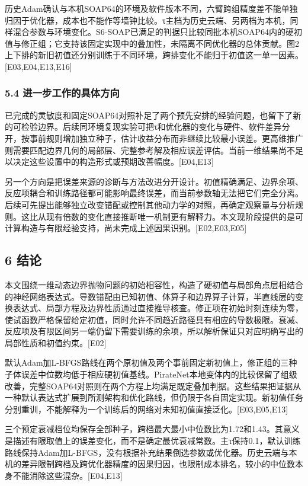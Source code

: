\documentclass[11pt,a4paper]{article}
\begin{document}
历史Adam确认与本机SOAP64的环境及软件版本不同，六臂跨组精度差不能单独归因于优化器，成本也不能作等墙钟比较。τ主档为历史云端、另两档为本机，同样混合参数与环境变化。S6-SOAP已满足的判据只比较同批本机SOAP64内的硬初值与修正组；它支持该固定实现中的叠加性，未隔离不同优化器的总体贡献。图2上下排的新旧初值还分别训练于不同环境，跨排变化不能归于初值这一单一因素。{[}E03,E04,E13,E16{]}

\subsubsection{5.4 进一步工作的具体方向}\label{ux8fdbux4e00ux6b65ux5de5ux4f5cux7684ux5177ux4f53ux65b9ux5411}

已完成的灵敏度和固定SOAP64对照补足了两个预先安排的经验问题，也留下了新的可检验边界。后续同环境复现实验可把τ和优化器的变化与硬件、软件差异分开，按事前规则增加独立种子，估计收益分布而非继续比较最小误差。更高维推广则需要匹配边界几何的局部层、完整参考解及相应误差评估。当前一维结果尚不足以决定这些设置中的构造形式或预期改善幅度。{[}E04,E13{]}

另一个方向是把误差来源的诊断与方法改进分开设计。初值精确满足、边界余项、反应项耦合和训练路径都可能影响最终误差，而当前参数轴无法把它们完全分离。后续可先提出能够独立改变错配或控制其他动力学的对照，再确定观察量与分析规则。这比从现有倍数的变化直接推断唯一机制更有解释力。本文现阶段提供的是可计算构造与有限经验支持，尚未完成上述因果识别。{[}E02,E03,E05{]}

\subsection{6 结论}\label{ux7ed3ux8bba}

本文围绕一维动态边界抛物问题的初始相容性，构造了硬初值与局部角点层相结合的神经网络表达式。导数错配由已知初值、体算子和边界算子计算，半直线层的变换表达式、局部方程及边界性质通过直接推导核查。修正项在初始时刻连续为零，使试函数严格保留给定初值，同时允许不同趋近路径具有相应的导数极限。衰减、反应项及有限区间另一端仍留下需要训练的余项，所以解析保证只对应明确写出的局部性质和初值约束。{[}E02{]}

默认Adam加L-BFGS路线在两个原初值及两个事前固定新初值上，修正组的三种子体误差中位数均低于相应硬初值基线。PirateNet本地变体内的比较保留了组级改善，完整SOAP64对照则在两个方程上均满足既定叠加判据。这些结果把证据从一种默认表达式扩展到所测架构和优化路线，但仍限于各自固定实现。新初值任务分别重训，不能解释为一个训练后的网络对未知初值直接泛化。{[}E03,E05,E13{]}

三个预定衰减档位均保存全部种子，跨档最大最小中位数比为1.72和1.43。其意义是描述有限取值上的误差变化，而不是确定最优衰减常数。主τ保持0.1，默认训练路线保持Adam加L-BFGS，没有根据补充结果倒选参数或优化器。历史云端与本机的差异限制跨档及跨优化器精度的因果归因，也限制成本排名，较小的中位数本身不能消除这些混杂。{[}E04,E13{]}
\end{document}
